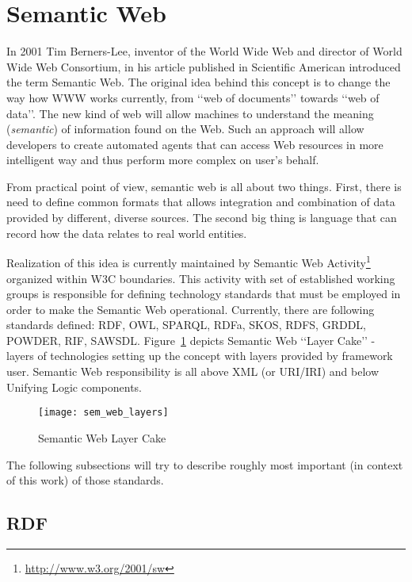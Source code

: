 
\section{Semantic Web}
\label{sec:ch2_semantic_web}

In 2001 Tim Berners-Lee, inventor of the World Wide Web and director of World Wide Web Consortium, in his
article published in Scientific American\cite{berneslee:semanticWeb} introduced the term Semantic Web. The
original idea behind this concept is to change the way how WWW works currently, from \lq\lq{}web of
documents\rq\rq{} towards \lq\lq{}web of data\rq\rq{}. The new kind of web will allow machines to
understand the meaning (\emph{semantic}) of information found on the Web. Such an approach will allow
developers to create automated agents that can access Web resources in more intelligent way and thus perform
more complex on user\rq{}s behalf.

From practical point of view, semantic web is all about two things. First, there is need to define common
formats that allows integration and combination of data provided by different, diverse sources. The second big
thing is language that can record how the data relates to real world entities. 

Realization of this idea is currently maintained by Semantic Web
Activity\footnote{\url{http://www.w3.org/2001/sw}} organized within W3C boundaries. This activity with set of
established working groups is responsible for defining technology standards that must be employed in order to
make the Semantic Web operational. Currently, there are following standards defined: RDF, OWL, SPARQL,
RDFa, SKOS, RDFS, GRDDL, POWDER, RIF, SAWSDL. Figure~\ref{fig:sem_web_layers} depicts Semantic Web
\lq\lq{}Layer Cake\rq\rq{} - layers of technologies setting up the concept with layers provided by framework user. Semantic Web responsibility is all above XML (or URI/IRI) and below Unifying Logic components.

\begin{figure}[ht]
  \centering
  \texttt{[image: sem\_web\_layers]}
  \caption{Semantic Web Layer Cake}
  \label{fig:sem_web_layers}
\end{figure}

The following subsections will try to describe roughly most important (in context of this work) of those standards.

\subsection{RDF}

